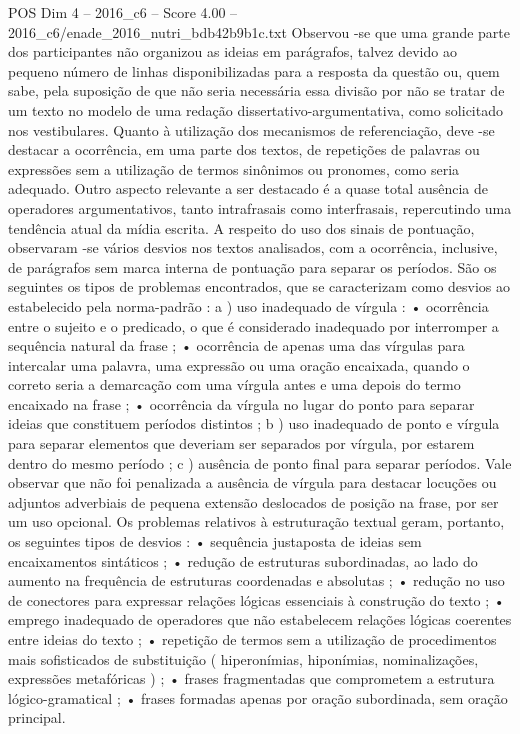 \begin{textsample}{POS Dim 4 – 2016\_c6 – Score 4.00 – 2016\_c6/enade\_2016\_nutri\_bdb42b9b1c.txt}
Observou -se que uma grande parte dos participantes não organizou as ideias em parágrafos, talvez devido ao pequeno número de linhas disponibilizadas para a resposta da questão ou, quem sabe, pela suposição de que não seria necessária essa divisão por não se tratar de um texto no modelo de uma redação dissertativo-argumentativa, como solicitado nos vestibulares.
Quanto à utilização dos mecanismos de referenciação, deve -se destacar a ocorrência, em uma parte dos textos, de repetições de palavras ou expressões sem a utilização de termos sinônimos ou pronomes, como seria adequado.
Outro aspecto relevante a ser destacado é a quase total ausência de operadores argumentativos, tanto intrafrasais como interfrasais, repercutindo uma tendência atual da mídia escrita.
A respeito do uso dos sinais de pontuação, observaram -se vários desvios nos textos analisados, com a ocorrência, inclusive, de parágrafos sem marca interna de pontuação para separar os períodos.
São os seguintes os tipos de problemas encontrados, que se caracterizam como desvios ao estabelecido pela norma-padrão : a ) uso inadequado de vírgula : • ocorrência entre o sujeito e o predicado, o que é considerado inadequado por interromper a sequência natural da frase ; • ocorrência de apenas uma das vírgulas para intercalar uma palavra, uma expressão ou uma oração encaixada, quando o correto seria a demarcação com uma vírgula antes e uma depois do termo encaixado na frase ; • ocorrência da vírgula no lugar do ponto para separar ideias que constituem períodos distintos ; b ) uso inadequado de ponto e vírgula para separar elementos que deveriam ser separados por vírgula, por estarem dentro do mesmo período ; c ) ausência de ponto final para separar períodos.
Vale observar que não foi penalizada a ausência de vírgula para destacar locuções ou adjuntos adverbiais de pequena extensão deslocados de posição na frase, por ser um uso opcional.
Os problemas relativos à estruturação textual geram, portanto, os seguintes tipos de desvios : • sequência justaposta de ideias sem encaixamentos sintáticos ; • redução de estruturas subordinadas, ao lado do aumento na frequência de estruturas coordenadas e absolutas ; • redução no uso de conectores para expressar relações lógicas essenciais à construção do texto ; • emprego inadequado de operadores que não estabelecem relações lógicas coerentes entre ideias do texto ; • repetição de termos sem a utilização de procedimentos mais sofisticados de substituição ( hiperonímias, hiponímias, nominalizações, expressões metafóricas ) ; • frases fragmentadas que comprometem a estrutura lógico-gramatical ; • frases formadas apenas por oração subordinada, sem oração principal.

\end{textsample}
